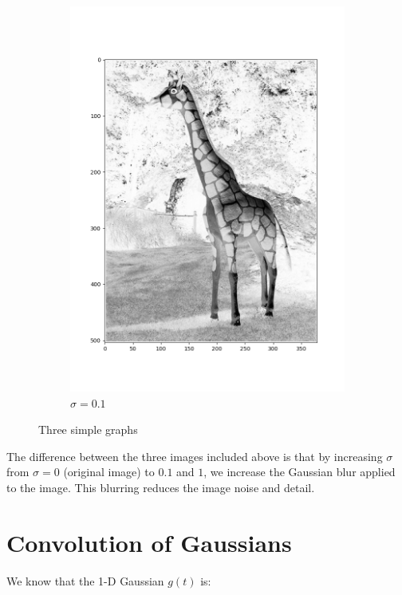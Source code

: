 \documentclass[12pt, oneside]{article}
\begin{document}
\begin{figure}[H]
\begin{subfigure}[b]{0.3\textwidth}
        \includegraphics[width=\textwidth]{imgs/q1_plot2.png}
        \caption{$\sigma = 0.1$}
        \label{fig:five over x}
    \end{subfigure}
       \caption{Three simple graphs}
       \label{fig:three graphs}
\end{figure}

The difference between the three images included above is that by increasing 
$\sigma$ from $\sigma = 0$ (original image) to $0.1$ and $1$, we increase the 
Gaussian blur applied to the image. This blurring reduces the image noise and 
detail.

\section{Convolution of Gaussians}

We know that the 1-D Gaussian $g(t)$ is:
\end{document}
